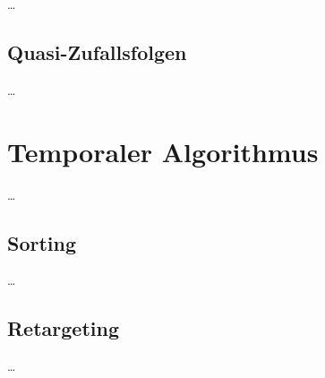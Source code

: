 \dots

\newpage
\section{Quasi-Zufallsfolgen}
\label{ch:Content1:sec:QuasiRandomSequences}


\dots



\newpage
\chapter{Temporaler Algorithmus}
\label{ch:TemporalerAlgorithmus}


\dots


\section{Sorting}
\label{ch:Content2:sec:Sorting}


\dots


\section{Retargeting}
\label{ch:Content2:sec:Retargeting}


\dots
